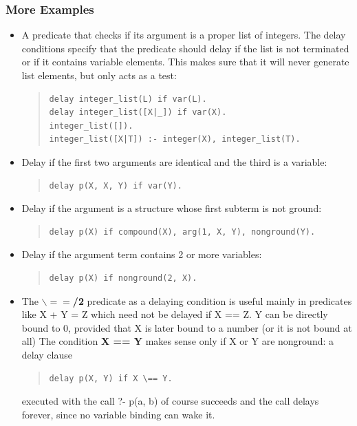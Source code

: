 \subsubsection{More Examples}
\begin{itemize}
\item
A predicate that checks if its argument is a proper list of integers.
The delay conditions specify that the predicate should delay if the list
is not terminated or if it contains variable elements.
This makes sure that it will never generate list elements, but only
acts as a test:
\begin{quote}\begin{verbatim}
delay integer_list(L) if var(L).
delay integer_list([X|_]) if var(X).
integer_list([]).
integer_list([X|T]) :- integer(X), integer_list(T).  
\end{verbatim}\end{quote}

\item
Delay if the first two arguments are identical and the third is a variable:
\begin{quote}\begin{verbatim}
delay p(X, X, Y) if var(Y).
\end{verbatim}\end{quote}

\item
Delay if the argument is a structure whose first subterm is not ground:
\begin{quote}\begin{verbatim}
delay p(X) if compound(X), arg(1, X, Y), nonground(Y).
\end{verbatim}\end{quote}

\item
Delay if the argument term contains 2 or more variables:
\begin{quote}\begin{verbatim}
delay p(X) if nonground(2, X).
\end{verbatim}\end{quote}

\item
The
{\bf $\backslash==$/2}
predicate as a delaying condition is useful mainly
in predicates like X + Y = Z which need not be delayed if X == Z.
Y can be directly bound to 0, provided that X is later bound to a number
(or it is not bound at all)
The condition {\bf X {\bsl}== Y} makes sense
only if X or Y are nonground: a delay clause
\begin{quote}\begin{verbatim}
delay p(X, Y) if X \== Y.
\end{verbatim}\end{quote}
executed with the call ?- p(a, b) of course succeeds and the call delays
forever, since no variable binding can wake it.
\end{itemize}

